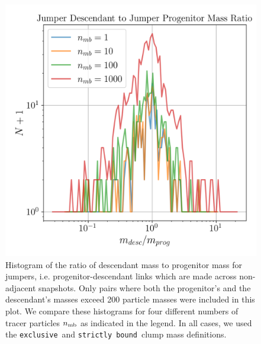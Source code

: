 \documentclass[a4paper,twocolumn,fleqn,usenatbib]{mnras}
\newcommand{\exc}{\texttt{exclusive}}
\newcommand{\sad}{\texttt{strictly bound}}
\begin{document}
\begin{figure}
  \centering
  \includegraphics[width=.9\linewidth, keepaspectratio]{images/tree-statistics-my-threshold/jumper_mass_ratio-ntrace.png}%
  \caption{ Histogram of the ratio of descendant mass to progenitor
    mass for jumpers, i.e.  progenitor-descendant links which are made
    across non-adjacent snapshots.  Only pairs where both the
    progenitor's and the descendant's masses exceed 200 particle
    masses were included in this plot.  We compare these histograms
    for four different numbers of tracer particles $n_{\rm mb}$ as
    indicated in the legend.  In all cases, we used the \exc\ and
    \sad\ clump mass definitions.
  }%
  \label{fig:jumper-mass-ratio}
\end{figure}
\end{document}
